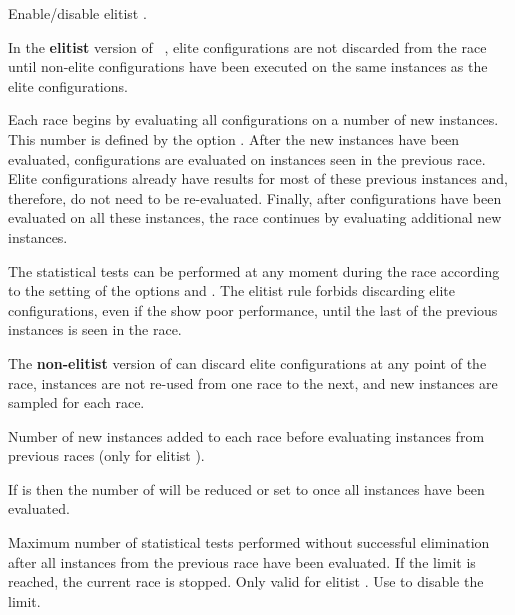 \begin{description}
Enable/disable elitist \irace.

 In the \textbf{elitist} version of ~\citep{LopDubPerStuBir2016irace}, elite configurations are not discarded from the race until non-elite configurations have been executed on the same instances as the elite configurations.

 Each race begins by evaluating all configurations on a number of new instances. This number is defined by the option . After the new instances have been evaluated, configurations are evaluated on instances seen in the previous race.  Elite configurations already have results for most of these previous instances and, therefore, do not need to be re-evaluated. Finally, after configurations have been evaluated on all these instances, the race continues by evaluating additional new instances. 

 The statistical tests can be performed at any moment during the race according to the setting of the options  and . The elitist rule forbids discarding elite configurations, even if the show poor performance, until the last of the previous instances is seen in the race. 

 The \textbf{non-elitist} version of \irace can discard elite configurations at any point of the race, instances are not re-used from one race to the next, and new instances are sampled for each race.

 Number of new instances added to each race before evaluating instances from previous races (only for elitist \irace).
 \begin{xwarningbox}
 
 If  is  then the number of  will be reduced or set to  once all instances have been evaluated.
\end{xwarningbox}

  Maximum number of statistical tests performed without successful elimination after all instances from the previous race have been evaluated. If the limit is reached, the current race is stopped. Only valid for elitist \irace. Use  to disable the limit.

\end{description}

